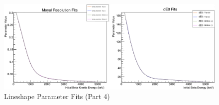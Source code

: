 \begin{figure}[h!!tb]
	\centering
	\includegraphics[width=.999\linewidth]
	{Figures/LineshapeParams_part4.png}
	\caption[Lineshape Parameter Fits (Part 4)]{Lineshape Parameter Fits (Part 4)}	
\end{figure}


